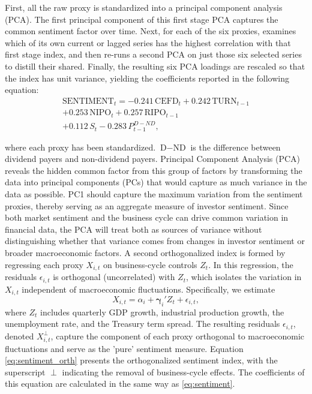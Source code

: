 First, all the raw proxy is standardized into a principal component analysis (PCA). The first principal component of this first stage PCA captures the common sentiment factor over time. Next, for each of the six proxies,  examines which of its own current or lagged series has the highest correlation with that first stage index, and then re-runs a second PCA on just those six selected series to distill their shared. Finally, the resulting six PCA loadings are rescaled so that the index has unit variance, yielding the coefficients reported in the following equation:
\begin{equation}
    \label{eq:sentiment}
    \begin{split}
    \text{SENTIMENT}_t = -0.241\,\text{CEFD}_t + 0.242\,\text{TURN}_{t-1} \\ + 0.253\,\text{NIPO}_t 
    + 0.257\,\text{RIPO}_{t-1} \\ + 0.112\,S_t - 0.283\,P^{D-ND}_{t-1} , 
    \end{split}
\end{equation}

where each proxy has been standardized. $\text{D}-\text{ND}$ is the difference between dividend payers and non-dividend payers. Principal Component Analysis (PCA) reveals the hidden common factor from this group of factors by transforming the data into principal components (PCs) that would capture as much variance in the data as possible. PC1 should capture the maximum variation from the sentiment proxies, thereby serving as an aggregate measure of investor sentiment. Since both market sentiment and the business cycle can drive common variation in financial data, the PCA will treat both as sources of variance without distinguishing whether that variance comes from changes in investor sentiment or broader macroeconomic factors. A second orthogonalized index is formed by regressing each proxy \(X_{i,t}\) on business-cycle controls \(Z_t\). In this regression, the residuals \(\epsilon_{i,t}\) is orthogonal (uncorrelated) with \(Z_t\), which isolates the variation in \(X_{i,t}\) independent of macroeconomic fluctuations.
Specifically, we estimate
\begin{equation}
X_{i,t} = \alpha_i + \boldsymbol{\gamma}_i'Z_t + \epsilon_{i,t},
\end{equation}
where \(Z_t\) includes quarterly GDP growth, industrial production growth, the unemployment rate, and the Treasury term spread. The resulting residuals \(\epsilon_{i,t}\), denoted \(X_{i,t}^\perp\), capture the component of each proxy orthogonal to macroeconomic fluctuations and serve as the 'pure' sentiment measure. Equation \ref{eq:sentiment_orth} presents the orthogonalized sentiment index, with the superscript \(\perp\) indicating the removal of business-cycle effects. The coefficients of this equation are calculated in the same way as \cref{eq:sentiment}.

